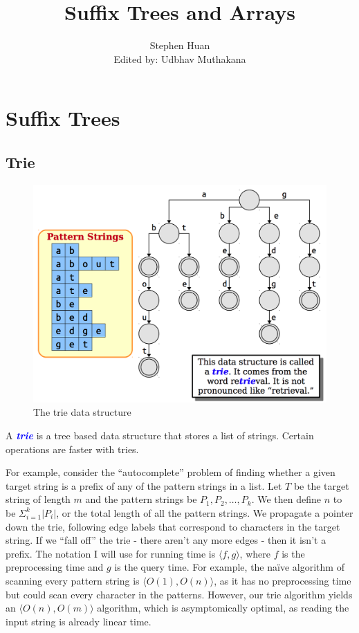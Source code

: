 \documentclass[11pt, oneside]{article}
\title{Suffix Trees and Arrays}
\author{Stephen Huan \\ Edited by: Udbhav Muthakana}
\newcommand{\emphasis}[1]{\textcolor{blue}{\textbf{\textit{#1}}}}
\begin{document}
\maketitle

\section{Suffix Trees}
\subsection{Trie}

\begin{figure}[h!]
\centering
\includegraphics[scale=0.25]{trie}
\caption{The trie data structure}
\end{figure}

A \emphasis{trie} is a tree based data structure that stores a list of strings.
Certain operations are faster with tries.

For example, consider the ``autocomplete'' problem of finding whether a given target string is a prefix of any of the pattern strings in a list.
Let \( T \) be the target string of length \( m \) and the pattern strings be \( P_1, P_2, \dots, P_k \).
We then define \( n \) to be \( \Sigma^{k}_{i = 1} |P_i| \), or the total length of all the pattern strings.
We propagate a pointer down the trie, following edge labels that correspond to characters in the target string.
If we ``fall off'' the trie - there aren't any more edges - then it isn't a prefix.
The notation I will use for running time is \( \langle f, g \rangle \),
where \( f \) is the preprocessing time and \( g \) is the query time.
For example, the naïve algorithm of scanning every pattern string
is \( \langle O(1), O(n) \rangle \), as it has no preprocessing time
but could scan every character in the patterns.
However, our trie algorithm yields an \( \langle O(n), O(m) \rangle \) algorithm,
which is asymptomically optimal, as reading the input string is already linear time.
\end{document}
